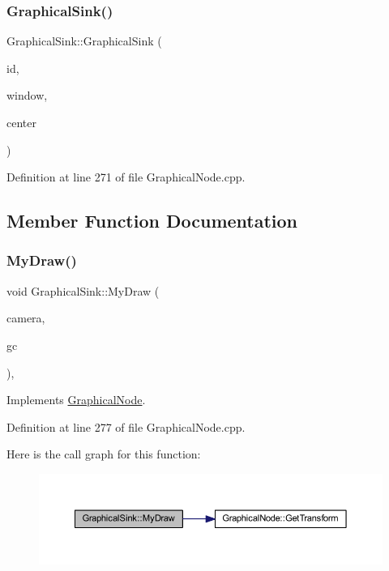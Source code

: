 \subsubsection{\texorpdfstring{Graphical\+Sink()}{GraphicalSink()}\hspace{0.1cm}{\footnotesize\ttfamily [2/2]}}
{\footnotesize\ttfamily Graphical\+Sink\+::\+Graphical\+Sink (\begin{DoxyParamCaption}\item[{\hyperlink{_graphical_element_8h_ade5fd6c85839a416577ff9de1605141e}{Element\+Key}}]{id,  }\item[{wx\+Window $\ast$}]{window,  }\item[{wx\+Point2\+D\+Double}]{center }\end{DoxyParamCaption})}



Definition at line 271 of file Graphical\+Node.\+cpp.



\subsection{Member Function Documentation}
\mbox{\label{class_graphical_sink_abac58f5bfe23ab2a799560171c036507}} 
\subsubsection{\texorpdfstring{My\+Draw()}{MyDraw()}}
{\footnotesize\ttfamily void Graphical\+Sink\+::\+My\+Draw (\begin{DoxyParamCaption}\item[{const wx\+Affine\+Matrix2D \&}]{camera,  }\item[{wx\+Graphics\+Context $\ast$}]{gc }\end{DoxyParamCaption})\hspace{0.3cm}{\ttfamily [override]}, {\ttfamily [virtual]}}



Implements \hyperlink{class_graphical_node_a4a5d4f48454a9721a940499d4f59b0ce}{Graphical\+Node}.



Definition at line 277 of file Graphical\+Node.\+cpp.

Here is the call graph for this function\+:
\nopagebreak
\begin{figure}[H]
\begin{center}
\leavevmode
\includegraphics[width=350pt]{class_graphical_sink_abac58f5bfe23ab2a799560171c036507_cgraph}
\end{center}
\end{figure}


